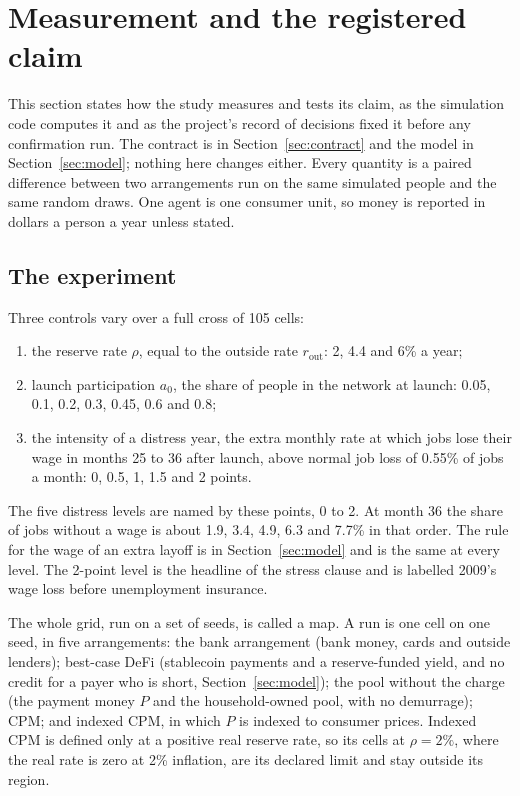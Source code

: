 \section{Measurement and the registered claim}\label{sec:measurement}

This section states how the study measures and tests its claim, as the simulation code computes it and as the
project's record of decisions fixed it before any confirmation run. The contract is in Section~\ref{sec:contract} and
the model in Section~\ref{sec:model}; nothing here changes either. Every quantity is a paired difference between
two arrangements run on the same simulated people and the same random draws. One agent is one consumer unit, so
money is reported in dollars a person a year unless stated.

\subsection{The experiment}

Three controls vary over a full cross of 105 cells:
\begin{enumerate}[nosep]
  \item the reserve rate $\rho$, equal to the outside rate $r_{\mathrm{out}}$: 2, 4.4 and 6\% a year;
  \item launch participation $a_{0}$, the share of people in the network at launch: 0.05, 0.1, 0.2, 0.3, 0.45,
        0.6 and 0.8;
  \item the intensity of a distress year, the extra monthly rate at which jobs lose their wage in months 25 to 36
        after launch, above normal job loss of 0.55\% of jobs a month: 0, 0.5, 1, 1.5 and 2 points.
\end{enumerate}
The five distress levels are named by these points, 0 to 2. At month 36 the share of jobs without a wage is
about 1.9, 3.4, 4.9, 6.3 and 7.7\% in that order. The rule for the wage of an extra layoff is in
Section~\ref{sec:model} and is the same at every level. The 2-point level is the headline of the stress clause and
is labelled 2009's wage loss before unemployment insurance.

The whole grid, run on a set of seeds, is called a map. A run is one cell on one seed, in five arrangements:
the bank arrangement (bank money, cards and outside lenders); best-case DeFi (stablecoin payments and a
reserve-funded yield, and no credit for a payer who is short, Section~\ref{sec:model}); the pool without the charge
(the payment money $P$ and the household-owned pool, with no demurrage); CPM; and indexed CPM, in which $P$ is
indexed to consumer prices. Indexed CPM is defined only at a positive real reserve rate, so its cells at
$\rho = 2\%$, where the real rate is zero at 2\% inflation, are its declared limit and stay outside its region.

